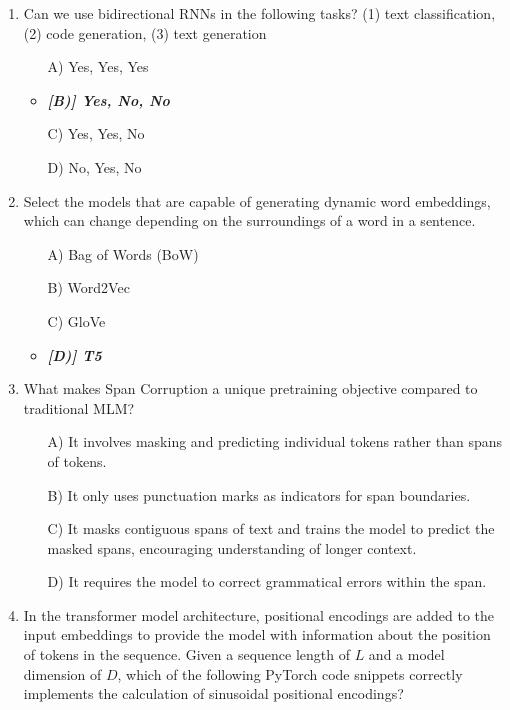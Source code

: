 \documentclass[10pt]{article}
\begin{document}
\begin{enumerate}
    \item Can we use bidirectional RNNs in the following tasks? (1) text classification, (2) code generation, (3) text generation
    \begin{itemize}
        \item[A)] Yes, Yes, Yes 
        \item\textit{\textbf{[B)] Yes, No, No} }
        \item[C)] Yes, Yes, No 
        \item[D)] No, Yes, No
    \end{itemize}


    \item Select the models that are capable of generating dynamic word embeddings, which can change depending on the surroundings of a word in a sentence.
    \begin{itemize}
        \item[A)] Bag of Words (BoW)
        \item[B)] Word2Vec 
        \item[C)] GloVe
        \item\textbf{\textit{[D)] T5}}
    \end{itemize}


    \item What makes Span Corruption a unique pretraining objective compared to traditional MLM?
    \begin{itemize}
        \item[A)] It involves masking and predicting individual tokens rather than spans of tokens.
        \item[B)] It only uses punctuation marks as indicators for span boundaries.
        \item[C)] It masks contiguous spans of text and trains the model to predict the masked spans, encouraging understanding of longer context.
        \item[D)] It requires the model to correct grammatical errors within the span.
    \end{itemize}

    \item In the transformer model architecture, positional encodings are added to the input embeddings to provide the model with information about the position of tokens in the sequence. Given a sequence length of \(L\) and a model dimension of \(D\), which of the following PyTorch code snippets correctly implements the calculation of sinusoidal positional encodings?


\end{enumerate}
\end{document}
